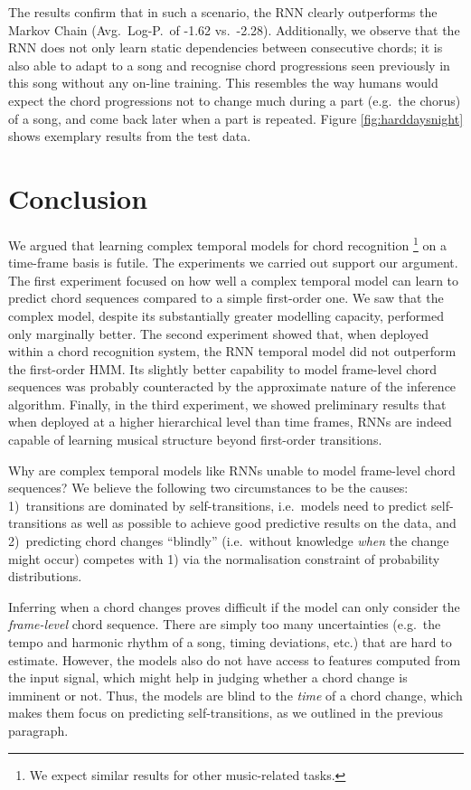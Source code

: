 \documentclass[twocolumn]{article}
\begin{document}
The results confirm that in such a scenario, the RNN clearly outperforms the
Markov Chain (Avg.\ Log-P.\ of -1.62 vs.\ -2.28). Additionally, we observe that
the RNN does not only learn static dependencies between consecutive chords; it
is also able to adapt to a song and recognise chord progressions seen
previously in this song without any on-line training. This resembles the way
humans would expect the chord progressions not to change much during a part
(e.g.\ the chorus) of a song, and come back later when a part is repeated.
Figure \ref{fig:harddaysnight} shows exemplary results from the test data.

\section{Conclusion}

We argued that learning complex temporal models for chord recognition
\footnote{We expect similar results for other music-related tasks.} on a
time-frame basis is futile. The experiments we carried out support our
argument. The first experiment focused on how well a complex temporal model
can learn to predict chord sequences compared to a simple first-order one. We
saw that the complex model, despite its substantially greater modelling
capacity, performed only marginally better. The second experiment showed that,
when deployed within a chord recognition system, the RNN temporal model did
not outperform the first-order HMM. Its slightly better capability to
model frame-level chord sequences was probably counteracted by the approximate
nature of the inference algorithm. Finally, in the third experiment, we
showed preliminary results that when deployed at a higher hierarchical level
than time frames, RNNs are indeed capable of learning musical structure
beyond first-order transitions.

Why are complex temporal models like RNNs unable to model frame-level chord
sequences? We believe the following two circumstances to be the causes:
1)~transitions are dominated by self-transitions, i.e.\ models need to predict
self-transitions as well as possible to achieve good predictive results on the
data, and 2)~predicting chord changes ``blindly'' (i.e.\ without knowledge
\emph{when} the change might occur) competes with 1) via the normalisation
constraint of probability distributions.

Inferring when a chord changes proves difficult if the model can only consider
the \emph{frame-level} chord sequence. There are simply too many uncertainties
(e.g.\ the tempo and harmonic rhythm of a song, timing deviations, etc.) that
are hard to estimate. However, the models also do not have access to features
computed from the input signal, which might help in judging whether a chord
change is imminent or not. Thus, the models are blind to the \emph{time} of a
chord change, which makes them focus on predicting self-transitions, as we
outlined in the previous paragraph.
\end{document}
